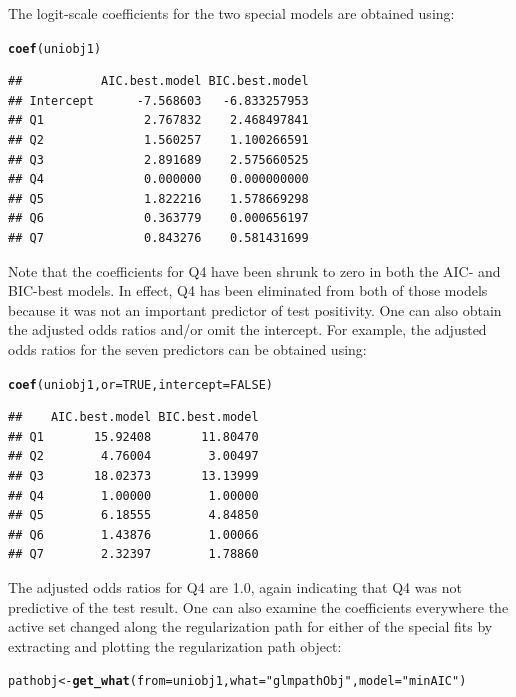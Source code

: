 \documentclass[11pt]{report}\usepackage[]{graphicx}\usepackage[]{xcolor}
\makeatletter
\newcommand{\hlnum}[1]{\textcolor[rgb]{0.686,0.059,0.569}{#1}}%
\newcommand{\hlstr}[1]{\textcolor[rgb]{0.192,0.494,0.8}{#1}}%
\newcommand{\hlstd}[1]{\textcolor[rgb]{0.345,0.345,0.345}{#1}}%
\newcommand{\hlkwb}[1]{\textcolor[rgb]{0.69,0.353,0.396}{#1}}%
\newcommand{\hlkwc}[1]{\textcolor[rgb]{0.333,0.667,0.333}{#1}}%
\newcommand{\hlkwd}[1]{\textcolor[rgb]{0.737,0.353,0.396}{\textbf{#1}}}%
\newenvironment{kframe}{%
 \def\at@end@of@kframe{}%
 \ifinner\ifhmode%
  \def\at@end@of@kframe{\end{minipage}}%
  \begin{minipage}{\columnwidth}%
 \fi\fi%
 \def\FrameCommand##1{\hskip\@totalleftmargin \hskip-\fboxsep
 \colorbox{shadecolor}{##1}\hskip-\fboxsep
     \hskip-\linewidth \hskip-\@totalleftmargin \hskip\columnwidth}%
 \MakeFramed {\advance\hsize-\width
   \@totalleftmargin\z@ \linewidth\hsize
   \@setminipage}}%
 {\par\unskip\endMakeFramed%
 \at@end@of@kframe}
\newenvironment{knitrout}{}{} %
\makeatother
\begin{document}
The logit-scale coefficients for the two special models
are obtained using:
\begin{knitrout}
\color{fgcolor}\begin{kframe}
\begin{alltt}
\hlkwd{coef}\hlstd{(uniobj1)}
\end{alltt}
\begin{verbatim}
##           AIC.best.model BIC.best.model
## Intercept      -7.568603   -6.833257953
## Q1              2.767832    2.468497841
## Q2              1.560257    1.100266591
## Q3              2.891689    2.575660525
## Q4              0.000000    0.000000000
## Q5              1.822216    1.578669298
## Q6              0.363779    0.000656197
## Q7              0.843276    0.581431699
\end{verbatim}
\end{kframe}
\end{knitrout}
Note that the coefficients for Q4 have been shrunk to zero in both the
AIC- and BIC-best models. In effect, Q4 has been eliminated from both
of those models because it was not an important predictor of test
positivity. One can also obtain the adjusted odds ratios and/or omit the
intercept.  For example, the adjusted odds ratios for the seven
predictors can be obtained using:
\begin{knitrout}
\color{fgcolor}\begin{kframe}
\begin{alltt}
\hlkwd{coef}\hlstd{(uniobj1,} \hlkwc{or} \hlstd{=} \hlnum{TRUE}\hlstd{,} \hlkwc{intercept} \hlstd{=} \hlnum{FALSE}\hlstd{)}
\end{alltt}
\begin{verbatim}
##    AIC.best.model BIC.best.model
## Q1       15.92408       11.80470
## Q2        4.76004        3.00497
## Q3       18.02373       13.13999
## Q4        1.00000        1.00000
## Q5        6.18555        4.84850
## Q6        1.43876        1.00066
## Q7        2.32397        1.78860
\end{verbatim}
\end{kframe}
\end{knitrout}
The adjusted odds ratios for Q4 are 1.0, again indicating that Q4 was
not predictive of the test result.  One can also examine the
coefficients everywhere the active set changed along the
regularization path for either of the special fits by extracting and
plotting the regularization path object:
\begin{knitrout}
\color{fgcolor}\begin{kframe}
\begin{alltt}
\hlstd{pathobj} \hlkwb{<-} \hlkwd{get_what}\hlstd{(}\hlkwc{from} \hlstd{= uniobj1,} \hlkwc{what} \hlstd{=} \hlstr{"glmpathObj"}\hlstd{,} \hlkwc{model} \hlstd{=} \hlstr{"minAIC"}\hlstd{)}
\end{alltt}
\end{kframe}
\end{knitrout}
\end{document}
